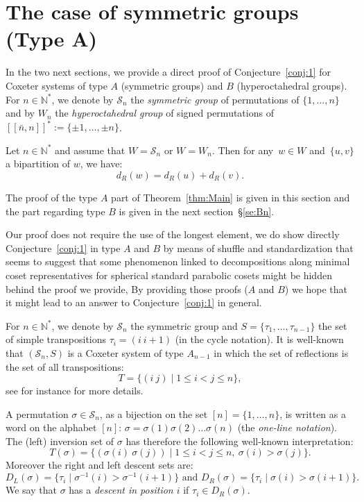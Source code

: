 \documentclass[ALCO,Unicode]{cedram}
\theoremstyle{definition}
\newcommand{\Sym}[1]{\mathcal{S}_{#1}}
\newcommand{\Symn}{\Sym{n}}
\newcommand{\Bsetnn}{[\![\bar{n},n ]\!]^*}
\begin{document}
\section{The case of symmetric groups (Type A)}\label{se:Sn}


In  the two next sections, we provide a direct proof of Conjecture~\ref{conj:1} for Coxeter systems of type $A$ (symmetric groups) and $B$ (hyperoctahedral groups). For $n\in\mathbb N^*$, we denote by $\mathcal S_n$ the {\em symmetric group} of permutations of $\{1,\dots , n\}$  and by $W_n$ the {\em hyperoctahedral group} of signed permutations of  $\Bsetnn:=\{\pm 1,\dots,\pm n\}$.

\begin{thm}\label{thm:Main} Let $n\in\mathbb N^*$ and assume  that $W=\mathcal S_n$ or $W=W_n$. Then for any~$w\in W$ and~$\{u,v\}$ a bipartition of $w$, we have:
 $$
 d_R(w)=d_R(u)+d_R(v).
 $$
\end{thm}

The proof of the type $A$  part of Theorem~\ref{thm:Main} is given in this section  and the part regarding type $B$ is given in the next section~\S\ref{se:Bn}. 

\begin{remark}\label{rem:GeneralizeAB} Our proof does not require the use of the longest element, we do show directly Conjecture~\ref{conj:1} in type $A$ and $B$ by means of shuffle and standardization that seems to suggest that some phenomenon linked to decompositions along minimal coset representatives for spherical standard parabolic cosets might be hidden behind the proof we provide, By providing those proofs ($A$ and $B$) we hope that it might lead to an answer to Conjecture~\ref{conj:1} in general.  
\end{remark}




For $n\in\mathbb N^*$, we denote by $\Symn$ the symmetric group and $S=\{\tau_1,\dots,\tau_{n-1}\}$ the set of simple transpositions $\tau_i = (i\ i+1)$ (in the cycle notation). It is well-known that $(\Symn,S)$ is a Coxeter system of type $A_{n-1}$ in which the set of reflections is the set of all transpositions:
$$
T=\{(i\ j)\mid 1\leq i<j\leq n\},
$$
see for instance \cite[Chapters 1 and 2]{BjBr05} for more details.

A permutation  $\sigma \in \Symn$, as a bijection on the set $[n]=\{1,\dots,n\}$, is written as a word on the alphabet $[n]$: $\sigma=\sigma(1) \sigma(2) \dots \sigma(n)$ (the  {\em one-line notation}). The (left) inversion set of $\sigma$ has therefore the following well-known interpretation: 
$$
T(\sigma)=\{(\sigma(i)\ \sigma(j))\mid 1\leq i<j\leq n,\ \sigma(i)>\sigma(j) \}.
$$
Moreover the right and left descent sets are:
$$
D_L(\sigma)=\{\tau_i \mid \sigma^{-1}(i)>\sigma^{-1}(i+1)\}\textrm{ and }D_R(\sigma)=\{\tau_i \mid \sigma(i)>\sigma(i+1)\}.
$$
We say that $\sigma$ has a \emph{descent in position $i$} if $\tau_i\in D_R(\sigma)$.
\end{document}
